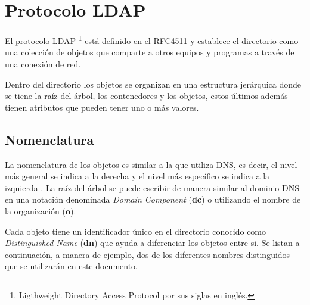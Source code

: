 \section {Protocolo \textsc{LDAP}}

El protocolo \textsc{\gls{LDAP}} \footnote{Ligthweight Directory Access Protocol por sus siglas en ingl\'{e}s.} est\'{a} definido en el \textsc{\gls{RFC}}4511 \cite{_rfc_????-5} y establece el directorio como una colecci\'{o}n de objetos que comparte a otros equipos y programas a trav\'{e}s de una conexi\'{o}n de red.

Dentro del directorio los objetos se organizan en una estructura jer\'{a}rquica donde se tiene la ra\'{i}z del \'{a}rbol, los contenedores y los objetos, estos \'{u}ltimos adem\'{a}s tienen atributos que pueden tener uno o m\'{a}s valores.

  \subsection {Nomenclatura}

La nomenclatura de los objetos es similar a la que utiliza \textsc{\gls{DNS}}, es decir, el nivel m\'{a}s general se indica a la derecha y el nivel m\'{a}s espec\'{i}fico se indica a la izquierda \cite{_appendix_????}. La ra\'{i}z del \'{a}rbol se puede escribir de manera similar al dominio \textsc{\gls{DNS}} en una notaci\'{o}n denominada \textit{Domain Component} (\textbf{dc}) o utilizando el nombre de la organizaci\'{o}n (\textbf{o}).

{
 \begin{table}[H]
 \caption{Nomenclatura del nodo ra\'{i}z de \textsc{LDAP}}{}
 \label{tab:nomenclatura-ldap-root}
 \noindent{} %
 \end{table}
}

Cada objeto tiene un identificador \'{u}nico en el directorio conocido como \textit{Distinguished Name} (\textbf{dn}) que ayuda a diferenciar los objetos entre si. Se listan a continuaci\'{o}n, a manera de ejemplo, dos de los diferentes nombres distinguidos que se utilizar\'{a}n en este documento.

